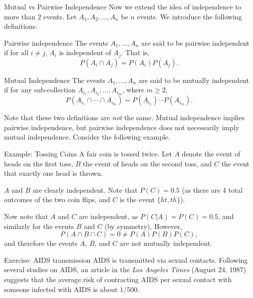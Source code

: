 \begin{frame}[allowframebreaks]{Mutual vs Pairwise Independence}
  Now we extend the idea of independence to more than 2 events. Let $A_1, A_2, \ldots, A_n$ be $n$ events. We introduce the following definitions: 
  
  \begin{block}{Pairwise independence}
    The events $A_1, \ldots, A_n$ are said to be \alert{pairwise independent} if for all $i \neq j$, $A_i$ is independent of $A_j$. That is,
    $$
    P(A_i \cap A_j) = P(A_i)P(A_j).
    $$
  \end{block}
  
  \begin{block}{Mutual Independence}
    The events $A_1, \ldots, A_n$ are said to be \alert{mutually independent} if for any sub-collection $A_{i_1}, A_{i_2}, \ldots, A_{i_m}$, where $m \geq 2$,
    $$
    P(A_{i_1} \cap \cdots \cap A_{i_m}) = P(A_{i_1})\cdots P(A_{i_m}).
    $$
  \end{block}
  
  Note that these two definitions are \emph{not} the same. Mutual independence implies pairwise independence, but pairwise independence does not necessarily imply mutual independence.
  Consider the following example.
  
  \begin{exampleblock}{Example: Tossing Coins}
    A fair coin is tossed twice. Let $A$ denote the event of heads on the first toss, $B$ the event of heads on the second toss, and $C$ the event that exactly one head is thrown.
    
    $A$ and $B$ are clearly independent. Note that $P(C) = 0.5$ (as there are 4 total outcomes of the two coin flips, and $C$ is the event $\{ht, th\}$).
    
    Now note that $A$ and $C$ are independent, as $P(C | A) = P(C) = 0.5$, and similarly for the events $B$ and $C$ (by symmetry), However,
    $$
    P(A \cap B \cap C) = 0 \neq P(A)P(B)P(C),
    $$
    and therefore the events $A$, $B$, and $C$ are not mutually independent.
  \end{exampleblock}
  
  \framebreak
  
  \begin{exampleblock}{Exercise: AIDS transmission}
    AIDS is transmitted via sexual contacts. Following several studies on AIDS, an article in the \emph{Los Angeles Times} (August 24, 1987) suggests that the average risk of contracting AIDS per sexual contact with someone infected with AIDS is about $1/500$.
    

\end{exampleblock}
\end{frame}
